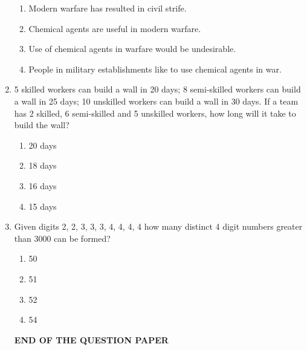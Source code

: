 \documentclass[journal]{IEEEtran}
\numberwithin{equation}{enumi}
\numberwithin{figure}{enumi}
\begin{document}
\begin{enumerate}
\begin{enumerate}
\item  Modern warfare has resulted in civil strife.
\item Chemical agents are useful in modern warfare.
\item  Use of chemical agents in warfare would be undesirable.
\item  People in military establishments like to use chemical agents in war.
\end{enumerate}



\item 5 skilled workers can build a wall in 20 days; 8 semi-skilled workers can build a wall in 25 days; 10 unskilled workers can build a wall in 30 days. If a team has 2 skilled, 6 semi-skilled and 5 unskilled workers, how long will it take to build the wall?
\hfill{}
\begin{multicols}{4}
    \begin{enumerate}
    \item  20 days 
    \item  18 days
    \item 16 days
    \item  15 days
    \end{enumerate}
    \end{multicols}    



\item Given digits 2, 2, 3, 3, 3, 4, 4, 4, 4 how many distinct 4 digit numbers greater than 3000 can be formed?
\hfill{}
\begin{multicols}{4}
    \begin{enumerate}
    \item  50 
    \item   51
    \item 52
    \item  54
    \end{enumerate}
    \end{multicols}    



\begin{center}
    \textbf{END OF THE QUESTION PAPER}
\end{center}
   






\end{enumerate}
\end{document}
